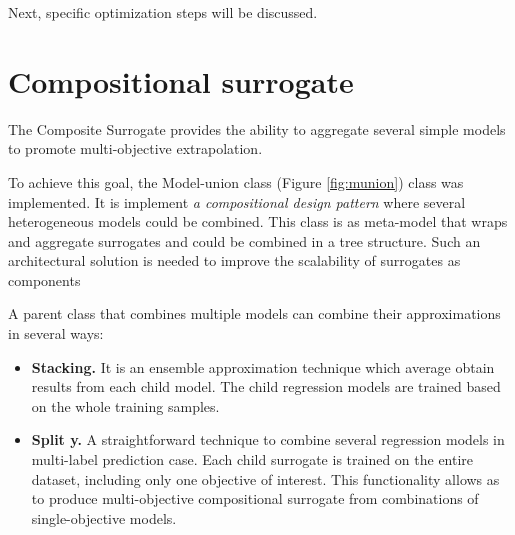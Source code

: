 Next, specific optimization steps will be discussed.
\section{Compositional surrogate}

    The Composite Surrogate provides the ability to aggregate several simple models to promote multi-objective extrapolation.

    To achieve this goal, the Model-union class (Figure \ref{fig:munion}) class was implemented. It is implement \emph{a compositional design pattern} \cite{bookGOF} where several heterogeneous models could be combined. This class is as meta-model that wraps and aggregate surrogates and could be combined in a tree structure. Such an architectural solution is needed to improve the scalability of surrogates as components
    
    A parent class that combines multiple models can combine their approximations in several ways:
    \begin{itemize}
        \item \textbf{Stacking.} It is an ensemble approximation technique which average obtain results from each child model. The child regression models are trained based on the whole training samples. 
        \item \textbf{Split y.} A straightforward technique to combine several regression models in multi-label prediction case. Each child surrogate is trained on the entire dataset, including only one objective of interest. This functionality allows as to produce multi-objective compositional surrogate from combinations of single-objective models.

    \end{itemize}

